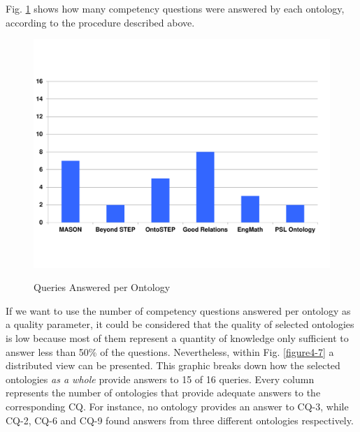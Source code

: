 Fig. \ref{figure4-6} shows how many competency   questions were answered by each ontology, according to the procedure described above. 



\begin{figure}
	\begin{center}
		\includegraphics[scale=0.5]{figure-chapterIV/fig4-6.pdf}\\
		\caption{Queries Answered per Ontology}
		\label{figure4-6}
	\end{center}
\end{figure}



If we want to use the number of competency questions answered per ontology as a quality parameter, it could be considered that the quality of selected ontologies is low because most of them represent a quantity of knowledge only sufficient to answer less than 50\% of the questions. Nevertheless, within Fig. \ref{figure4-7} a distributed view can be presented. This graphic breaks down how the selected ontologies \textit{as a whole} provide answers to 15 of 16 queries. Every column represents the number of ontologies that provide adequate answers to the corresponding CQ. For instance, no ontology provides an answer to CQ-3, while CQ-2, CQ-6 and CQ-9 found answers from three different ontologies respectively. 


